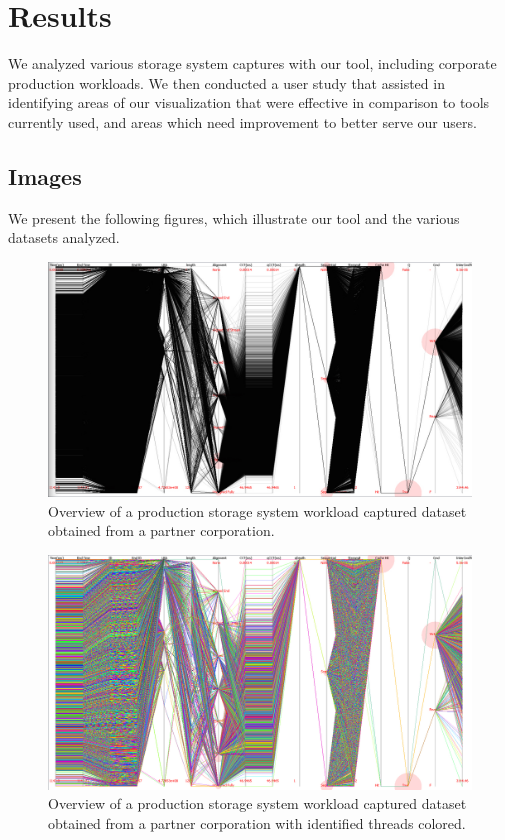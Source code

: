\documentclass[12pt]{ucthesis}
\begin{document}
\chapter{Results}
\label{results}

We analyzed various storage system captures with our tool, including corporate production workloads. We then conducted a user study that assisted in identifying areas of our visualization that were effective in comparison to tools currently used, and areas which need improvement to better serve our users.

\section{Images}
We present the following figures, which illustrate our tool and the various datasets analyzed.

\begin{figure}[h!]
 \centering
 \includegraphics[width=\textwidth]{images/1.jpg}
 \caption[Production workload obtained from a partner corporation.]{Overview of a production storage system workload captured dataset obtained from a partner corporation.}
\end{figure}

\begin{figure}[h!]
 \centering
 \includegraphics[width=\textwidth]{images/2.jpg}
 \caption[Production workload with threads colored.]{Overview of a production storage system workload captured dataset obtained from a partner corporation with identified threads colored.}
\end{figure}
\end{document}
